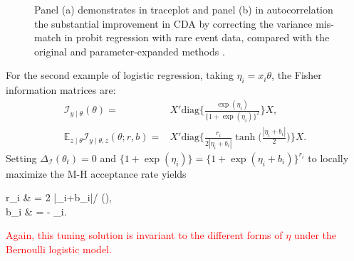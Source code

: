 \documentclass[11pt]{article}
\newcommand{\leo}[1]{{\textcolor{red}{#1}}}
\newcommand{\be}{\begin{equs}}
\newcommand{\ee}{\end{equs}}
\newcommand{\bb}[1]{\mathbb{#1}}
\newcommand{\mc}[1]{\mathcal{#1}}
\newcommand{\diag}{\text{diag}}
\begin{document}
\begin{figure}[H]
  {\caption{Panel (a) demonstrates in traceplot and panel (b) in autocorrelation the substantial improvement in CDA by correcting the variance mis-match in probit regression with rare event data, compared with the original \citep{albert1993bayesian} and parameter-expanded methods \citep{liu1999parameter}.}}
  {%
    \qquad
  }
\end{figure}
 

 
For the second example of logistic regression, taking $\eta_i=x_i\theta$, the Fisher information matrices
are:
 \begin{eqnarray}
\mc I_{y\mid \theta}({\theta}) =&  X' \diag\bigg\{\frac{\exp(\eta_i)}{ \{1+\exp(\eta_i)\} ^2}\bigg\} X, \nonumber \\
\bb E_{z\mid \theta}\mc I_{y\mid \theta,z}({\theta};r,b)= & X'  \diag\bigg\{ \frac{r_i}{2 |\eta_i+b_i|}\tanh\Big(\frac{|\eta_i+b_i|}{2} \Big)\bigg\} X .  \nonumber
\end{eqnarray}
Setting $\Delta_{\mc I}(\theta_t)=0$ and $ \{1+\exp(\eta_i)\}  = \{1+\exp(\eta_i+b_i)\}^{r_i}$
to locally maximize the M-H acceptance rate yields
\be
r_i & = {2 |\eta_i+b_i|}/ \tanh(),
\\ b_i & =  - \eta_i.
\ee
\leo{Again, this tuning solution is invariant to the different forms of $\eta$ under
the Bernoulli logistic model.}
\end{document}
